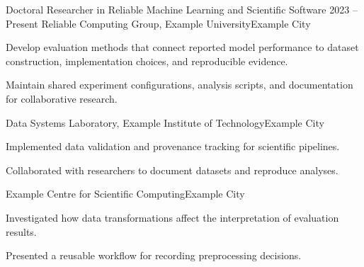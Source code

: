 \CVEntry
  {Doctoral Researcher in Reliable Machine Learning and Scientific Software}
  {2023 -- Present}
  {Reliable Computing Group, Example University}{Example City}{
  \begin{cvitems}
    \item Develop evaluation methods that connect reported model performance
      to dataset construction, implementation choices, and reproducible evidence.
    \item Maintain shared experiment configurations, analysis scripts, and
      documentation for collaborative research.
  \end{cvitems}
}
  {Data Systems Laboratory, Example Institute of Technology}{Example City}{
  \begin{cvitems}
    \item Implemented data validation and provenance tracking for scientific pipelines.
    \item Collaborated with researchers to document datasets and reproduce analyses.
  \end{cvitems}
}
  {Example Centre for Scientific Computing}{Example City}{
  \begin{cvitems}
    \item Investigated how data transformations affect the interpretation of evaluation results.
    \item Presented a reusable workflow for recording preprocessing decisions.
  \end{cvitems}
}
